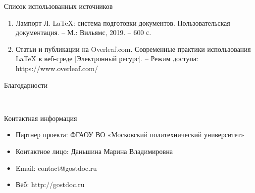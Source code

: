 \documentclass[final]{beamer}
\newlength{\onecolwid}
\begin{document}
\begin{frame}[t]
\begin{columns}[t]
\begin{column}{\onecolwid}
\begin{block}{Список использованных источников}

\begin{enumerate}
\item Лампорт Л. LaTeX: система подготовки документов. Пользовательская документация. – М.: Вильямс, 2019. – 600 с.
\item Статьи и публикации на Overleaf.com. Современные практики использования LaTeX в веб-среде [Электронный ресурс]. – Режим доступа: https://www.overleaf.com/
\end{enumerate}

\end{block}



\begin{block}{Благодарности}

\small{} \\

\end{block}



\begin{alertblock}{Контактная информация}

\begin{itemize}
\item Партнер проекта: ФГАОУ ВО «Московский политехнический университет»
\item Контактное лицо: Даньшина Марина Владимировна
\item Email: contact@gostdoc.ru
\item Веб: http://gostdoc.ru
\end{itemize}


\end{alertblock}
\end{column}
\end{columns}
\end{frame}
\end{document}
